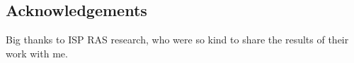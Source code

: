 \documentclass[a0,portrait]{a0poster}
\begin{document}
\begin{multicols}{2}

\nocite{*} %


\section*{Acknowledgements}

Big thanks to ISP RAS research, who were so kind to share the results of their work with me.


\end{multicols}
\end{document}
